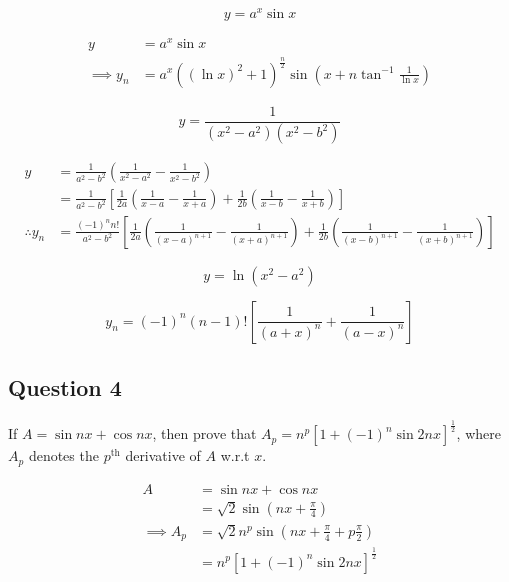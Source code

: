 \begin{asign}
	\[y=a^x\sin x\]
\end{asign}
\begin{anse}
	\[\begin{split}
		y&=a^x\sin x\\
		\implies y_n&=a^x((\ln x)^2+1)^\frac{n}{2}\sin(x+n\tan^{-1}\frac{1}{\ln x})
	\end{split}\]
\end{anse}
\begin{asign}
	\[y=\frac{1}{(x^2-a^2)(x^2-b^2)}\]
\end{asign}
\begin{anse}
	\[\begin{split}
		y&=\frac{1}{a^2-b^2}\left(\frac{1}{x^2-a^2}-\frac{1}{x^2-b^2}\right)\\
		&=\frac{1}{a^2-b^2}\left[\frac{1}{2a}\left(\frac{1}{x-a}-\frac{1}{x+a}\right)+\frac{1}{2b}\left(\frac{1}{x-b}-\frac{1}{x+b}\right)\right]\\
		\therefore y_n&=\frac{(-1)^nn!}{a^2-b^2}\left[\frac{1}{2a}\left(\frac{1}{(x-a)^{n+1}}-\frac{1}{(x+a)^{n+1}}\right)+\frac{1}{2b}\left(\frac{1}{(x-b)^{n+1}}-\frac{1}{(x+b)^{n+1}}\right)\right]
	\end{split}\]
\end{anse}
\begin{asign}
	\[y=\ln(x^2-a^2)\]
\end{asign}
\begin{anse}
	\[y_n=(-1)^n(n-1)![\frac{1}{(a+x)^n}+\frac{1}{(a-x)^n}]\]
\end{anse}
\subsection{Question 4}
\begin{asign}
	If $A=\sin nx+\cos nx$, then prove that $A_p=n^p[1+(-1)^n\sin 2nx]^\frac{1}{2}$, where $A_p$ denotes the $p^\text{th}$ derivative of $A$ w.r.t $x$.
\end{asign}
\begin{anse}
	\[\begin{split}
		A&=\sin nx+\cos nx\\
		&=\sqrt{2}\sin(nx+\frac{\pi}{4})\\
		\implies A_p &=\sqrt{2}n^p\sin(nx+\frac{\pi}{4}+p\frac{\pi}{2})\\
				&=n^p[1+(-1)^n\sin 2nx]^\frac{1}{2}
	\end{split}\]
\end{anse}
